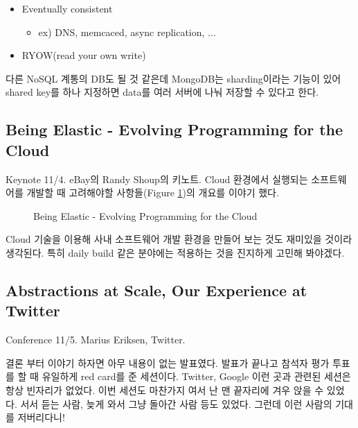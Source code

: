 \documentclass[11pt]{article}
\begin{document}
\begin{itemize}
\item Eventually consistent
    \begin{itemize}
    \item ex) DNS, memcaced, async replication, ...
    \end{itemize}
\item RYOW(read your own write)
\end{itemize}
 
다른 NoSQL 계통의 DB도 될 것 같은데 MongoDB는 sharding이라는 기능이
있어 shared key를 하나 지정하면 data를 여러 서버에 나눠 저장할 수
있다고 한다.

\subsection{Being Elastic - Evolving Programming for the Cloud}

Keynote 11/4. eBay의 Randy Shoup의 키노트.
Cloud 환경에서 실행되는 소프트웨어를 개발할 때
고려해야할 사항들(Figure \ref{cloud})의 개요를 이야기 했다.


\begin{figure}[t]
    \begin{Frame}
        \begin{center}
        \end{center}
    \end{Frame}
    \caption{Being Elastic - Evolving Programming for the Cloud}
    \label{cloud}
\end{figure}

Cloud 기술을 이용해 사내 소프트웨어 개발 환경을 만들어 보는 것도 재미있을 
것이라 생각된다. 특히 daily build 같은 분야에는 적용하는 것을 진지하게 
고민해 봐야겠다.

\subsection{Abstractions at Scale, Our Experience at Twitter}

Conference 11/5. Marius Eriksen, Twitter.

결론 부터 이야기 하자면 아무 내용이 없는 발표였다. 발표가 끝나고 참석자 평가 
투표를 할 때 유일하게 red card를 준 세션이다. 
Twitter, Google 이런 곳과 관련된 세션은 항상 빈자리가 없었다. 
이번 세션도 마찬가지 여서 난 맨 끝자리에 겨우 앉을 수 있었다. 서서 듣는
사람, 늦게 와서 그냥 돌아간 사람 등도 있었다. 그런데 이런 사람의 기대를 
저버리다니!
 
\end{document}
